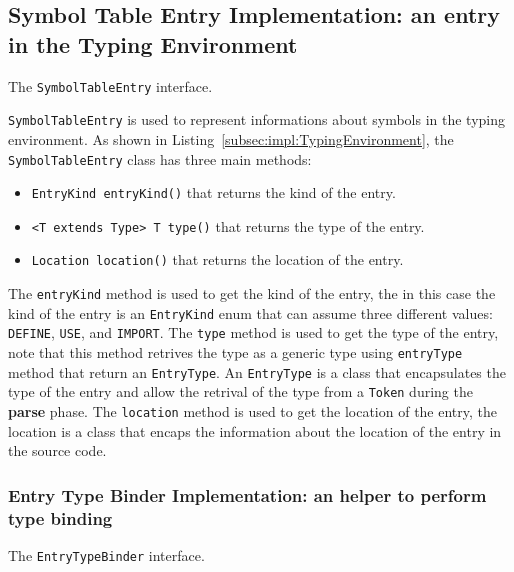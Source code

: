 \subsection{Symbol Table Entry Implementation: an entry in the Typing Environment}\label{subsec:impl:SymbolTableEntry}
\begin{Listing}[tb]
    \centering
    \caption{The \texttt{SymbolTableEntry} interface.}
    \label{lst:impl:SymbolTableEntry}
\end{Listing}

\texttt{SymbolTableEntry} is used to represent informations about symbols in the typing environment. As shown in Listing~\ref{subsec:impl:TypingEnvironment}, the \texttt{SymbolTableEntry} class has three main methods:

\begin{itemize}
    \item \texttt{EntryKind entryKind()} that returns the kind of the entry.
    \item \texttt{<T extends Type> T type()} that returns the type of the entry.
    \item \texttt{Location location()} that returns the location of the entry.
\end{itemize}

The \texttt{entryKind} method is used to get the kind of the entry, the in this case the kind of the entry is an \texttt{EntryKind} enum that can assume three different values: \texttt{DEFINE}, \texttt{USE}, and \texttt{IMPORT}. The \texttt{type} method is used to get the type of the entry, note that this method retrives the type as a generic type using \texttt{entryType} method that return an \texttt{EntryType}. An \texttt{EntryType} is a class that encapsulates the type of the entry and allow the retrival of the type from a \texttt{Token} during the \textbf{parse} phase.
The \texttt{location} method is used to get the location of the entry, the location is a class that encaps the information about the location of the entry in the source code.


\subsubsection{Entry Type Binder Implementation: an helper to perform type binding}\label{subsec:impl:EntryTypeBinder}

\begin{Listing}[tb]
    \centering
    \caption{The \texttt{EntryTypeBinder} interface.}
    \label{lst:impl:EntryTypeBinder}
\end{Listing}

